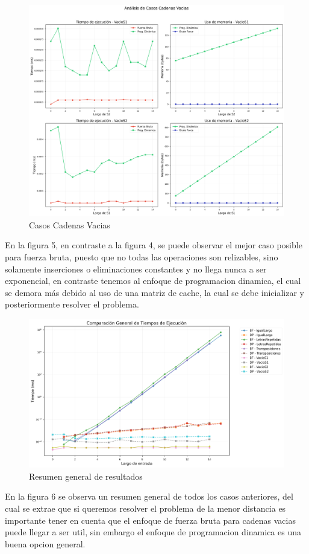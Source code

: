 \begin{figure}[H]
    \centering
        \includegraphics[width=\textwidth]{images/casos_especiales.png} 
        \caption{Casos Cadenas Vacias}
    \label{fig:scatterplot_5}
\end{figure}
En la figura 5, en contraste a la figura 4, se puede observar el mejor caso posible para fuerza bruta, puesto que no todas las operaciones son relizables, sino solamente
inserciones o eliminaciones constantes y no llega nunca a ser exponencial, en contraste tenemos al enfoque de programacion dinamica, el cual se demora más
debido al uso de una matriz de cache, la cual se debe inicializar y posteriormente resolver el problema.
\begin{figure}[H]
    \centering
        \includegraphics[width=\textwidth]{images/comparacion_general_tiempos.png}    
    \caption{Resumen general de resultados}
    \label{fig:scatterplot_6}
\end{figure}
En la figura 6 se observa un resumen general de todos los casos anteriores, del cual se extrae que si queremos resolver el problema de la menor distancia 
es importante tener en cuenta que el enfoque de fuerza bruta para cadenas vacias puede llegar a ser util, sin embargo el enfoque de 
programacion dinamica es una buena opcion general.
